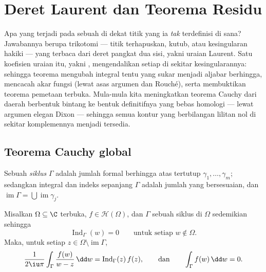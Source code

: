 \chapter{Deret Laurent dan Teorema Residu}
\label{ch:b3:residues}

Apa yang terjadi pada sebuah  di dekat titik yang ia
\emph{tak} terdefinisi di sana? Jawabannya berupa trikotomi  ---
titik terhapuskan, kutub, atau kesingularan hakiki --- yang terbaca dari
deret pangkat dua sisi, yakni uraian Laurent. Satu koefisien
uraian itu, yakni \emph{}, mengendalikan setiap 
di sekitar kesingularannya: sehingga teorema  mengubah
integral tentu yang sukar menjadi aljabar berhingga, mencacah akar
fungsi (lewat asas argumen dan Rouché), serta membuktikan teorema pemetaan
terbuka. Mula-mula kita meningkatkan teorema Cauchy dari
daerah berbentuk bintang ke bentuk definitifnya yang bebas homologi ---
lewat argumen elegan Dixon --- sehingga semua kontur yang berbilangan
lilitan nol di sekitar komplemennya menjadi tersedia.

\section{Teorema Cauchy global}

Sebuah \emph{siklus} $\Gamma$ adalah jumlah formal berhingga
atas  tertutup $\gamma_1, \dots, \gamma_m$; sedangkan integral dan
indeks sepanjang $\Gamma$ adalah jumlah yang bersesuaian, dan
$\operatorname{im}\Gamma = \bigcup\operatorname{im}\gamma_j$.

\begin{theorem}
\label{thm:b3:residues:globalcauchy}
Misalkan $\Omega \subseteq \C$ terbuka, $f \in \mathcal H(\Omega)$,
dan $\Gamma$ sebuah siklus di $\Omega$ sedemikian sehingga
\[
\operatorname{Ind}_\Gamma(w) = 0
\qquad\text{untuk setiap } w \notin \Omega .
\]
Maka, untuk setiap $z \in \Omega\setminus\operatorname{im}\Gamma$,
\[
\frac1{2\iu\pi}\int_\Gamma\frac{f(w)}{w - z}\,\dd w =
\operatorname{Ind}_\Gamma(z)\,f(z),
\qquad\text{dan}\qquad
\int_\Gamma f(w)\,\dd w = 0 .
\]
\end{theorem}

